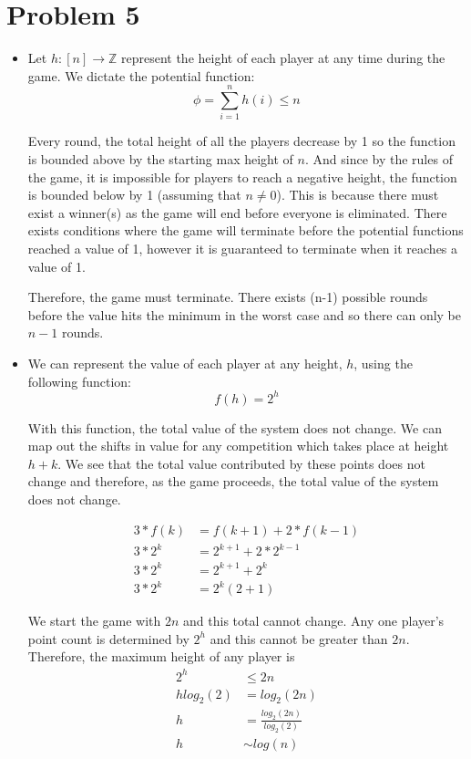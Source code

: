 \documentclass[12pt]{article}
\begin{document}
\section*{Problem 5}
\begin{itemize}
    \item[a)] Let $h: [n] \rightarrow \mathbb{Z}$ represent the height of each player at any time during the game. We dictate the potential function:
    \[\phi = \sum_{i=1}^{n} h(i) \leq n\]

    Every round, the total height of all the players decrease by 1 so the function is bounded above by the starting max height of $n$. And since by the rules of the game, it is impossible for players to reach a negative height, the function is bounded below by 1 (assuming that $n \neq 0$). This is because there must exist a winner(s) as the game will end before everyone is eliminated. There exists conditions where the game will terminate before the potential functions reached a value of 1, however it is guaranteed to terminate when it reaches a value of 1.

    Therefore, the game must terminate. There exists (n-1) possible rounds before the value hits the minimum in the worst case and so there can only be $n-1$ rounds.

    \item[b)]We can represent the value of each player at any height, $h$, using the following function: 
    \[f(h) = 2^h\]

    With this function, the total value of the system does not change. We can map out the shifts in value for any competition which takes place at height $h+k$. We see that the total value contributed by these points does not change and therefore, as the game proceeds, the total value of the system does not change.

    \begin{align*}
    3*f(k) &= f(k+1) + 2 * f(k-1) \\
    3*2^k &= 2^{k+1} + 2 * 2^{k-1} \\
    3*2^k &= 2^{k+1} + 2^{k} \\
    3*2^k &= 2^k(2+1)
    \end{align*}

    We start the game with $2n$ and this total cannot change. Any one player's point count is determined by $2^h$ and this cannot be greater than $2n$. Therefore, the maximum height of any player is 
    \begin{align*}
        2^h &\leq 2n \\
        hlog_2(2) &= log_2(2n) \\
        h &= \frac{log_2(2n)}{log_2(2)} \\
        h &\sim log(n)
    \end{align*}
    

\end{itemize}
\end{document}
